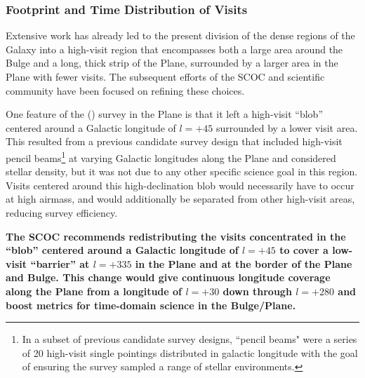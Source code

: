 \subsubsection{Footprint and Time Distribution of Visits}\label{sec:subG:footprint}

Extensive work has already led to the present division of the dense regions of the Galaxy into a high-visit region that encompasses both a large area around the Bulge and a long, thick strip of the Plane, surrounded by a larger area in the Plane with fewer visits. %
The subsequent efforts of the SCOC and scientific community have been focused on refining these choices.

One feature of the  () survey in the Plane is that it left a high-visit ``blob'' centered around a Galactic longitude of $l=+45$ surrounded by a lower visit area. This resulted from a previous candidate survey design that included high-visit pencil beams\footnote{In a subset of previous candidate survey designs, ``pencil beams" were a series of 20 high-visit single pointings distributed in galactic longitude with the goal of ensuring the survey sampled a range of stellar environments.} at varying Galactic longitudes along the Plane and considered stellar density, but it was not due to any other specific science goal in this region. Visits centered around this high-declination blob would necessarily have to occur at high airmass, and would additionally be separated from other high-visit areas, reducing survey efficiency.

{\bf The SCOC recommends redistributing the  visits concentrated in the ``blob'' centered around a Galactic longitude of $l=+45$ to cover a low-visit ``barrier'' at $l=+335$ in the Plane and at the border of the Plane and Bulge. This change would give continuous longitude coverage along the Plane from a longitude of $l=+30$ down through $l=+280$ and boost metrics for time-domain science in the Bulge/Plane.}


